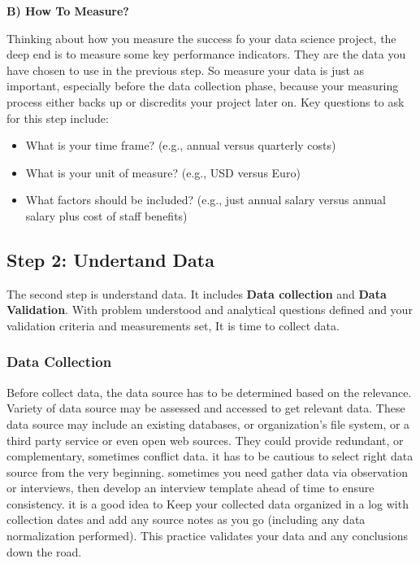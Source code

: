 \documentclass[
]{book}
\providecommand{\tightlist}{%
  \setlength{\itemsep}{0pt}\setlength{\parskip}{0pt}}
\begin{document}
\textbf{B) How To Measure? }

Thinking about how you measure the success fo your data science project, the deep end is to measure some key performance indicators. They are the data you have chosen to use in the previous step. So measure your data is just as important, especially before the data collection phase, because your measuring process either backs up or discredits your project later on. Key questions to ask for this step include:

\begin{itemize}
\tightlist
\item
  What is your time frame? (e.g., annual versus quarterly costs)
\item
  What is your unit of measure? (e.g., USD versus Euro)
\item
  What factors should be included? (e.g., just annual salary versus annual salary plus cost of staff benefits)
\end{itemize}

\hypertarget{step2}{%
\subsection*{Step 2: Undertand Data}\label{step2}}


The second step is understand data. It includes \textbf{Data collection} and \textbf{Data Validation}. With problem understood and analytical questions defined and your validation criteria and measurements set, It is time to collect data.

\hypertarget{data-collection}{%
\subsubsection*{Data Collection}\label{data-collection}}


Before collect data, the data source has to be determined based on the relevance. Variety of data source may be assessed and accessed to get relevant data. These data source may include an existing databases, or organization's file system, or a third party service or even open web sources. They could provide redundant, or complementary, sometimes conflict data. it has to be cautious to select right data source from the very beginning. sometimes you need gather data via observation or interviews, then develop an interview template ahead of time to ensure consistency. it is a good idea to Keep your collected data organized in a log with collection dates and add any source notes as you go (including any data normalization performed). This practice validates your data and any conclusions down the road.
\end{document}
